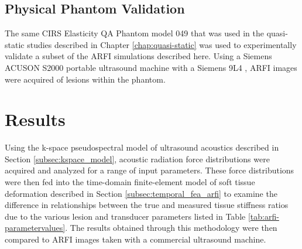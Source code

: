 		\subsection{Physical Phantom Validation}
			The same CIRS Elasticity QA Phantom model 049 that was used in the quasi-static studies described in Chapter \ref{chap:quasi-static} was used to experimentally validate a subset of the ARFI simulations described here. Using a Siemens ACUSON S2000  portable ultrasound machine with a Siemens 9L4 , ARFI images were acquired of lesions within the phantom. 

	\section{Results}
		Using the k-space pseudospectral model of ultrasound acoustics described in Section \ref{subsec:kspace_model}, acoustic radiation force distributions were acquired and analyzed for a range of input parameters. These force distributions were then fed into the time-domain finite-element model of soft tissue deformation described in Section \ref{subsec:temporal_fea_arfi} to examine the difference in relationships between the true and measured tissue stiffness ratios due to the various lesion and transducer parameters listed in Table \ref{tab:arfi-parametervalues}. The results obtained through this methodology were then compared to ARFI images taken with a commercial ultrasound machine. 

